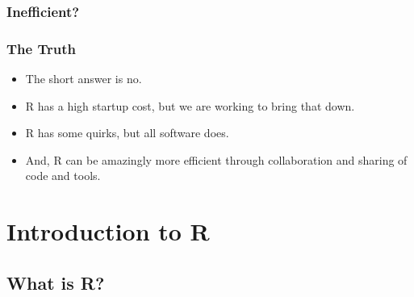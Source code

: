 \documentclass{beamer}
\begin{document}
{
\begin{frame}[plain]
\frametitle{Inefficient?}
\end{frame}
}


\begin{frame}
\frametitle{The Truth}
\begin{itemize}
   \item The short answer is no. 
   \pause
   \item R has a high startup cost, but we are working to bring that down. 
   \pause
   \item R has some quirks, but all software does.
   \pause
   \item And, R can be amazingly more efficient through collaboration and sharing of code and tools.
\end{itemize}
\end{frame}


\section{Introduction to R}
\label{sec:intro-r}

\subsection{What is R?}
\label{sec:what-r}
\end{document}
